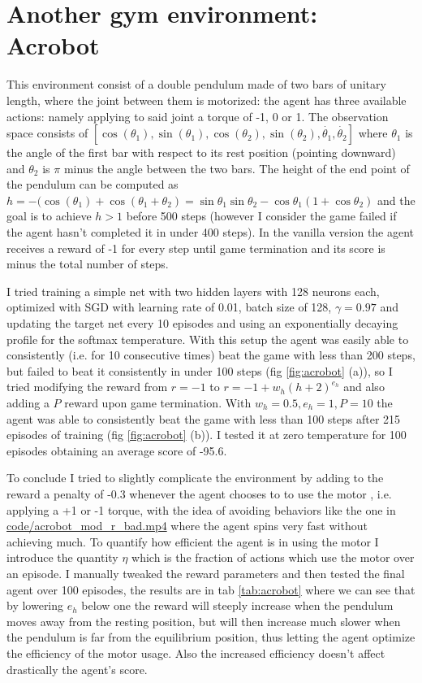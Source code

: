 \documentclass[a4paper, 11pt]{article}
\begin{document}
\section{Another gym environment: Acrobot}
  This environment consist of a double pendulum made of two bars of unitary length, where the joint between them is motorized: the agent has three available actions: namely applying to said joint a torque of -1, 0 or 1. The observation space consists of $[\cos(\theta_1), \sin(\theta_1), \cos(\theta_2), \sin(\theta_2), \dot{\theta_1}, \dot{\theta_2}]$ where $\theta_1$ is the angle of the first bar with respect to its rest position (pointing downward) and $\theta_2$ is $\pi$ minus the angle between the two bars.
  The height of the end point of the pendulum can be computed as $h = -(\cos(\theta_1) + \cos(\theta_1 + \theta_2) = \sin\theta_1\sin\theta_2 - \cos\theta_1 (1 + \cos\theta_2)$ and the goal is to achieve $h > 1$ before 500 steps (however I consider the game failed if the agent hasn't completed it in under 400 steps). In the vanilla version the agent receives a reward of -1 for every step until game termination and its score is minus the total number of steps.

  I tried training a simple net with two hidden layers with 128 neurons each, optimized with SGD with learning rate of 0.01, batch size of 128, $\gamma=0.97$  and updating the target net every 10 episodes and using an exponentially decaying profile for the softmax temperature.
  With this setup the agent was easily able to consistently (i.e. for 10 consecutive times) beat the game with less than 200 steps, but failed to beat it consistently in under 100 steps (fig \ref{fig:acrobot} (a)), so I tried modifying the reward from $r = -1$ to $r = -1 + w_h(h+2)^{e_h}$ and also adding a $P$ reward upon game termination. With $w_h=0.5, e_h=1, P=10$ the agent was able to consistently beat the game with less than 100 steps after 215 episodes of training (fig \ref{fig:acrobot} (b)). I tested it at zero temperature for 100 episodes obtaining an average score of -95.6.

  To conclude I tried to slightly complicate the environment by adding to the reward a penalty of -0.3 whenever the agent chooses to to use the motor , i.e. applying a +1 or -1 torque, with the idea of avoiding behaviors like the one in \url{code/acrobot_mod_r_bad.mp4} where the agent spins very fast without achieving much. To quantify how efficient the agent is in using the motor I introduce the quantity $\eta$ which is the fraction of actions which use the motor over an episode. I manually tweaked the reward parameters and then tested the final agent over 100 episodes, the results are in tab \ref{tab:acrobot} where we can see that by lowering $e_h$ below one the reward will steeply increase when the pendulum moves away from the resting position, but will then increase much slower when the pendulum is far from the equilibrium position, thus letting the agent optimize the efficiency of the motor usage. Also the increased efficiency doesn't affect drastically the agent's score.
\end{document}
